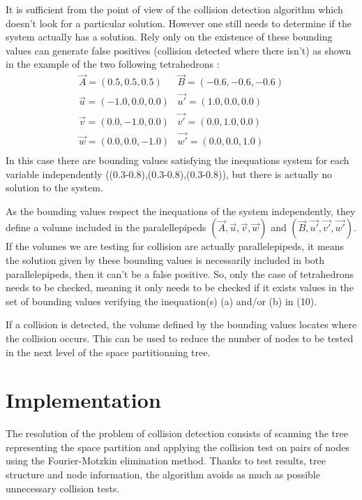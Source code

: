 \documentclass[12pt, a4paper]{article}
\begin{document}
It is sufficient from the point of view of the collision detection algorithm which doesn't look for a particular solution. However one still needs to determine if the system actually has a solution. Rely only on the existence of these bounding values can generate false positives (collision detected where there isn't) as shown in the example of the two following tetrahedrons :
\begin{equation}
\begin{array}{l|l}
\vec{A}=( 0.5,  0.5,  0.5) & \vec{B}=(-0.6, -0.6, -0.6)\\
\vec{u}=(-1.0,  0.0,  0.0) & \vec{u'}=( 1.0,  0.0,  0.0)\\
\vec{v}=( 0.0, -1.0,  0.0) & \vec{v'}=( 0.0,  1.0,  0.0)\\
\vec{w}=( 0.0,  0.0, -1.0) & \vec{w'}=( 0.0,  0.0,  1.0)\\
\end{array}
\end{equation}
In this case there are bounding values satisfying the inequations system for each variable independently ((0.3-0.8),(0.3-0.8),(0.3-0.8)), but there is actually no solution to the system.

As the bounding values respect the inequations of the system independently, they define a volume included in the paralellepipeds $(\vec{A},\vec{u},\vec{v},\vec{w})$ and $(\vec{B},\vec{u'},\vec{v'},\vec{w'})$. If the volumes we are testing for collision are actually parallelepipeds, it means the solution given by these bounding values is necessarily included in both parallelepipeds, then it can't be a false positive. So, only the case of tetrahedrons needs to be checked, meaning it only needs to be checked if it exists values in the set of bounding values verifying the inequation(s) (a) and/or (b) in (10).

If a collision is detected, the volume defined by the bounding values locates where the collision occurs. This can be used to reduce the number of nodes to be tested in the next level of the space partitionning tree. 

\section{Implementation}

The resolution of the problem of collision detection consists of scanning the tree representing the space partition and applying the collision test on pairs of nodes using the Fourier-Motzkin elimination method. Thanks to test results, tree structure and node information, the algorithm avoids as much as possible unnecessary collision tests.
\end{document}
